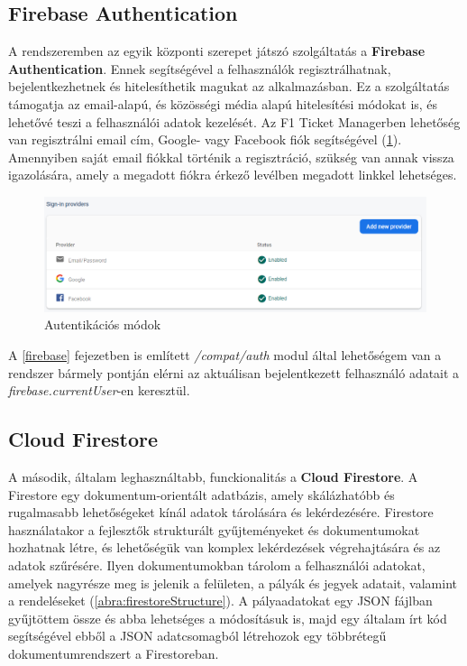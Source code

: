 \subsection {Firebase Authentication}

A rendszeremben az egyik központi szerepet játszó szolgáltatás a \textbf{Firebase Authentication}. Ennek segítségével a felhasználók regisztrálhatnak, bejelentkezhetnek és hitelesíthetik magukat az alkalmazásban. Ez a szolgáltatás támogatja az email-alapú, és közösségi média alapú hitelesítési módokat is, és lehetővé teszi a felhasználói adatok kezelését. Az F1 Ticket Managerben lehetőség van regisztrálni email cím, Google- vagy Facebook fiók segítségével (\ref{abra:loginMethods}). Amennyiben saját email fiókkal történik a regisztráció, szükség van annak vissza igazolására, amely a megadott fiókra érkező levélben megadott linkkel lehetséges.

\begin{figure}[!h]
	\centering
	\includegraphics[scale=0.4]{images/loginMethods}
	\caption{Autentikációs módok}
	\label{abra:loginMethods}
\end{figure}

A \ref{firebase} fejezetben is említett \textit{/compat/auth} modul által lehetőségem van a rendszer bármely pontján elérni az aktuálisan bejelentkezett felhasználó adatait a \textit{firebase.currentUser}-en keresztül.

\subsection {Cloud Firestore}

A második, általam leghasználtabb, funckionalitás a \textbf{Cloud Firestore}. A Firestore egy dokumentum-orientált adatbázis, amely skálázhatóbb és rugalmasabb lehetőségeket kínál adatok tárolására és lekérdezésére. Firestore használatakor a fejlesztők strukturált gyűjteményeket és dokumentumokat hozhatnak létre, és lehetőségük van komplex lekérdezések végrehajtására és az adatok szűrésére. Ilyen dokumentumokban tárolom a felhasználói adatokat, amelyek nagyrésze meg is jelenik a felületen, a pályák és jegyek adatait, valamint a rendeléseket (\ref{abra:firestoreStructure}). A pályaadatokat egy JSON fájlban gyűjtöttem össze és abba lehetséges a módosításuk is, majd egy általam írt kód segítségével ebből a JSON adatcsomagból létrehozok egy többrétegű dokumentumrendszert a Firestoreban.

